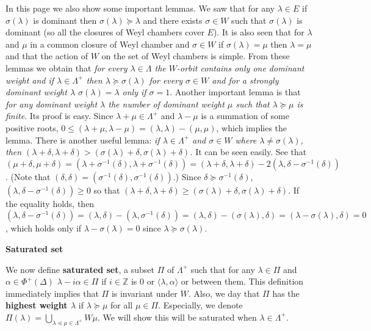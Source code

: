 \documentclass{article}
\newcommand{\InZ}{\mathbb{Z}}
\begin{document}
In this page we also show some important lemmas.
We saw that for any $\lambda \in E$ if $\sigma(\lambda)$ is dominant then $\sigma(\lambda) \succeq \lambda$ and there exists $\sigma \in W$ such that $\sigma(\lambda)$ is dominant (so all the closures of Weyl chambers cover $E$).
It is also seen that for $\lambda$ and $\mu$ in a common closure of Weyl chamber and $\sigma \in W$ if $\sigma(\lambda) = \mu$ then $\lambda = \mu$ and that the action of $W$ on the set of Weyl chambers is simple.
From these lemmas we obtain that \textit{for every $\lambda \in \Lambda$ the $W$-orbit contains only one dominant weight and if $\lambda \in \Lambda^+$ then $\lambda \succeq \sigma(\lambda)$ for every $\sigma \in W$ and for a strongly dominant weight $\lambda$ $\sigma(\lambda) = \lambda$ only if $\sigma = 1$}.
Another important lemma is that \textit{for any dominant weight $\lambda$ the number of dominant weight $\mu$ such that $\lambda \succeq \mu$ is finite}.
Its proof is easy.
Since $\lambda + \mu \in \Lambda^+$ and $\lambda - \mu$ is a summation of some positive roots, $0 \le (\lambda + \mu, \lambda - \mu) = (\lambda, \lambda) - (\mu, \mu)$, which implies the lemma.
There is another useful lemma: \textit{if $\lambda \in \Lambda^+$ and $\sigma \in W$ where $\lambda \ne \sigma(\lambda)$, then $(\lambda + \delta, \lambda + \delta) > (\sigma(\lambda) + \delta, \sigma(\lambda) + \delta)$.}
It can be seen easily.
See that $(\mu + \delta, \mu + \delta) = (\lambda + \sigma^{-1}(\delta), \lambda + \sigma^{-1}(\delta)) = (\lambda + \delta, \lambda + \delta) - 2(\lambda, \delta - \sigma^{-1}(\delta))$.
(Note that $(\delta, \delta) = (\sigma^{-1}(\delta), \sigma^{-1}(\delta))$.)
Since $\delta \succeq \sigma^{-1}(\delta)$, $(\lambda, \delta - \sigma^{-1}(\delta)) \ge 0$ so that $(\lambda + \delta, \lambda + \delta) \ge (\sigma(\lambda) + \delta, \sigma(\lambda) + \delta)$.
If the equality holds, then $(\lambda, \delta - \sigma^{-1}(\delta)) = (\lambda, \delta) - (\lambda, \sigma^{-1}(\delta)) = (\lambda, \delta) - (\sigma(\lambda), \delta) = (\lambda - \sigma(\lambda), \delta) = 0$, which holds only if $\lambda -\sigma(\lambda) = 0$ since $\lambda \succeq \sigma(\lambda)$.

\newpage

\textbf{Saturated set}

We now define \textbf{saturated set}, a subset $\Pi$ of $\Lambda^+$ such that for any $\lambda \in \Pi$ and $\alpha \in \Phi^+(\Delta)$ $\lambda - i\alpha \in \Pi$ if $i \in \InZ$ is $0$ or $\langle \lambda, \alpha \rangle$ or between them.
This definition immediately implies that $\Pi$ is invariant under $W$.
Also, we day that $\Pi$ has the \textbf{highest weight $\lambda$} if $\lambda \succeq \mu$ for all $\mu \in \Pi$.
Especially, we denote $\Pi(\lambda) = \bigcup_{\lambda \preceq \mu \in \Lambda^+} W \mu$.
We will show this will be saturated when $\lambda \in \Lambda^+$.
\end{document}
